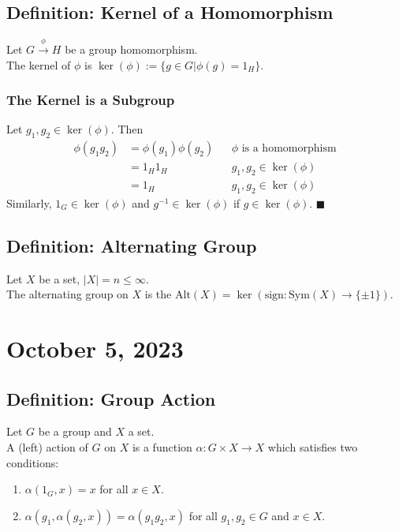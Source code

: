 \documentclass[11pt]{article}
\newcommand{\0}{\emptyset}
\begin{document}
\subsection*{Definition: Kernel of a Homomorphism}
\label{sec:orga589f08}
Let \(G\overset{\phi}{\to}H\) be a group homomorphism.\\[0pt]
The kernel of \(\phi\) is \(\ker(\phi):=\{g\in G|\phi(g)=1_{H}\}\).\\[0pt]
\subsubsection*{The Kernel is a Subgroup}
\label{sec:org2898544}
Let \(g_{1},g_{2}\in\ker(\phi)\). Then\\[0pt]
\begin{align*}
  \phi(g_{1}g_{2})
  &=\phi(g_{1})\phi(g_{2}) && \phi\text{ is a homomorphism}
  \\&=1_{H}1_{H} && g_{1},g_{2}\in\ker(\phi)
  \\&=1_{H} && g_{1},g_{2}\in\ker(\phi)
\end{align*}
Similarly, \(1_{G}\in\ker(\phi)\) and \(g^{-1}\in\ker(\phi)\) if \(g\in\ker(\phi)\). \(\blacksquare\) \\[0pt]
\subsection*{Definition: Alternating Group}
\label{sec:org4ec29bc}
Let \(X\) be a set, \(|X|=n\leq\infty\).\\[0pt]
The alternating group on \(X\) is the \(\text{Alt}(X)=\ker(\text{sign}:\text{Sym}(X)\to\{\pm1\})\).\\[0pt]
\section*{October 5, 2023}
\label{sec:org2fb8a6b}
\subsection*{Definition: Group Action}
\label{sec:org53d726c}
Let \(G\) be a group and \(X\) a set.\\[0pt]
A (left) action of \(G\) on \(X\) is a function \(\alpha:G\times X\to X\) which satisfies two conditions:\\[0pt]
\begin{enumerate}
\item \(\alpha(1_{G},x)=x\) for all \(x\in X\).\\[0pt]
\item \(\alpha(g_{1},\alpha(g_{2},x))=\alpha(g_{1}g_{2},x)\) for all \(g_{1},g_{2}\in G\) and \(x\in X\).\\[0pt]
\end{enumerate}
\end{document}
